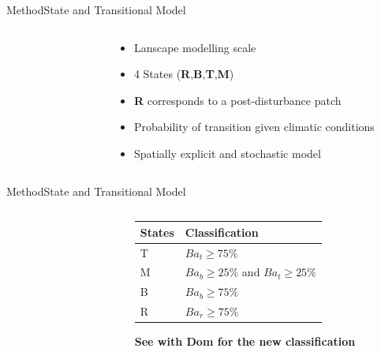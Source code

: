 \documentclass[10pt,aspectratio=149]{beamer}
\begin{document}
\begin{frame}{Method}{State and Transitional Model}

\begin{columns}[c]
	\begin{column}[c]{.40\paperwidth}
		\begin{figure}
			\small{}
		\end{figure}
	\end{column}
	\begin{column}[l]{.50\paperwidth}
		\begin{itemize}
			\item Lanscape modelling scale
			\item 4 States (\textbf{R},\textbf{B},\textbf{T},\textbf{M})
			\item \textbf{R} corresponds to a post-disturbance patch
			\item Probability of transition given climatic conditions
			\item Spatially explicit and stochastic model
		\end{itemize}
	\end{column}
\end{columns}
\end{frame}


\begin{frame}{Method}{State and Transitional Model}

\begin{columns}[c]
	\begin{column}[c]{.40\paperwidth}
		\begin{figure}
			\small{}
		\end{figure}
	\end{column}
	\begin{column}[l]{.50\paperwidth}
	\begin{table}
		\begin{tabular}{|l|l|}
			\hline
			\textbf{States}  & \textbf{Classification}\\
			\hline
			T & $Ba_t \geq 75\%$    \\
			M & $Ba_b \geq 25\%$ and $Ba_t \geq 25\%$ \\
			B & $Ba_b \geq 75\%$   \\
			R & $Ba_r  \geq 75\%$ \\
			\hline
		\end{tabular}
		\end{table}
		\textbf{See with Dom for the new classification}
	\end{column}
\end{columns}

\end{frame}
\end{document}
